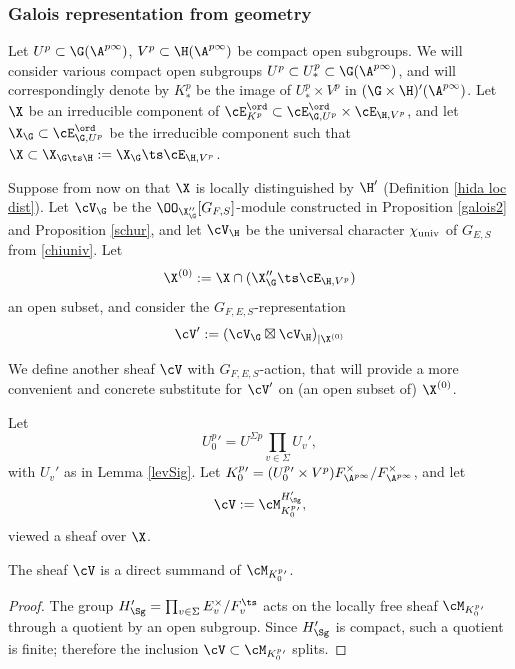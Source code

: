 \subsubsection{Galois representation from geometry}
Let $U^{p}\subset \G(\A^{p\infty})$, $V^{p}\subset \H(\A^{p\infty})$ be compact open subgroups. We will consider various  compact open subgroups $U^{p}\subset U^{p}_{*} \subset \G(\A^{p\infty})$, and will correspondingly denote by   $K^{p}_{*}$ be the image of $U^{p}_{*}\times V^{p}$ in $(\G\times \H)'(\A^{p\infty})$. Let $\X$ be an irreducible component of $\cE_{K_{}^{p}}^{\ord}\subset \cE_{\G, U^{p}}^{\ord}\times \cE_{\H, V^{p}}$, and let $\X_{\G}\subset\cE_{\G, U^{p}}^{\ord}$ be the irreducible component such that $\X\subset \X_{\G\ts \H}:=\X_{\G}\ts  \cE_{\H, V^{p}}$.


Suppose from now on that $\X$ is locally distinguished by $\H'$ (Definition \ref{hida loc dist}).
Let  $\cV_{\G}$ be the $\OO_{\X_{\G}''}[G_{F, S}]$-module   constructed in Proposition \ref{galois2} and Proposition \ref{schur}, and let $\cV_{\H}$ be the universal character $\chi_{\rm univ}$ of $G_{E, S}$   from \eqref{chiuniv}.
Let
$$\X^{(0)}:= \X\cap (\X_{\G}'' \ts  \cE_{\H, V^{p}})$$ an open subset,  and consider the $G_{F, E, S}$-representation
$$\cV':=(\cV_{\G}\boxtimes \cV_{\H})_{|\X^{(0)}}$$

We  define another  sheaf $\cV$  with $G_{F, E, S}$-action,  that will provide a more  convenient and concrete substitute for $\cV'$ on (an open subset of) $\X^{(0)}$.

 Let
$$U_{0}^{p}{}'=U^{\Sigma p}\prod_{v\in \Sigma } U_{v}',$$ with $U_{v}'$ as in Lemma \ref{levSig}.  Let $K_{0}^{p}{}'=(U_{0}^{p}{}'\times V^{p})F_{\A^{p\infty}}^{\times}/F_{\A^{p\infty}}^{\times}$, and let
$$\cV:=\cM_{K_{0}^{p}{}'}^{{H_{\Sg}'}},$$ viewed a sheaf over
$\X$.


\begin{lemm}\label{dirsum}
 The sheaf $\cV$ is a direct summand of $\cM_{K_{0}^{p}{}'}$.
 \end{lemm}
 \begin{proof} The  group ${H_{\Sg}'}=\prod_{v\in \Sigma} E_{v}^{\times}/F_{v}^{\ts}$ acts on the locally free sheaf  $\cM_{K^{p}_{0}{}'}$
through a quotient by an open subgroup. Since $H_{\Sg}'$ is compact, such a quotient is  finite;
 therefore the inclusion $\cV\subset \cM_{K_{0}^{p}{}'}$ splits.
 \end{proof}

